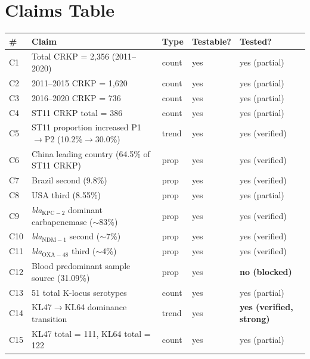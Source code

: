 \documentclass[11pt]{article}
\begin{document}
\section{Claims Table}
\begin{longtable}{@{}p{0.8cm}p{7cm}p{2cm}p{2cm}p{2.5cm}@{}}
\toprule
\# & Claim & Type & Testable? & Tested? \\
\midrule
\endhead
C1  & Total CRKP = 2{,}356 (2011--2020)                                    & count & yes & yes (partial) \\
C2  & 2011--2015 CRKP = 1{,}620                                             & count & yes & yes (partial) \\
C3  & 2016--2020 CRKP = 736                                                 & count & yes & yes (partial) \\
C4  & ST11 CRKP total = 386                                                 & count & yes & yes (partial) \\
C5  & ST11 proportion increased P1$\rightarrow$P2 (10.2\%$\rightarrow$30.0\%) & trend & yes & yes (verified) \\
C6  & China leading country (64.5\% of ST11 CRKP)                          & prop  & yes & yes (verified) \\
C7  & Brazil second (9.8\%)                                                 & prop  & yes & yes (verified) \\
C8  & USA third (8.55\%)                                                    & prop  & yes & yes (partial) \\
C9  & \emph{bla}$_{\mathrm{KPC-2}}$ dominant carbapenemase ($\sim$83\%)     & prop  & yes & yes (verified) \\
C10 & \emph{bla}$_{\mathrm{NDM-1}}$ second ($\sim$7\%)                     & prop  & yes & yes (verified) \\
C11 & \emph{bla}$_{\mathrm{OXA-48}}$ third ($\sim$4\%)                     & prop  & yes & yes (verified) \\
C12 & Blood predominant sample source (31.09\%)                             & prop  & yes & \textbf{no (blocked)} \\
C13 & 51 total K-locus serotypes                                            & count & yes & yes (partial) \\
C14 & KL47$\rightarrow$KL64 dominance transition                            & trend & yes & \textbf{yes (verified, strong)} \\
C15 & KL47 total = 111, KL64 total = 122                                    & count & yes & yes (partial) \\

\end{longtable}
\end{document}
